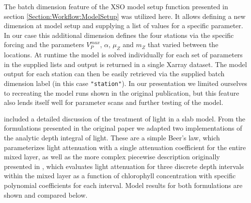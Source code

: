 \documentclass[journal abbreviation, manuscript]{copernicus}
\begin{document}
The batch dimension feature of the XSO model setup function presented in section \ref{Section:Workflow:ModelSetup} was utilized here. It allows defining a new dimension at model setup and supplying a list of values for a specific parameter. In our case this additional dimension defines the four stations via the specific forcing and the parameters $V_P^{max}$, $\alpha$, $\mu_Z$ and $m_Z$ that \citet{Anderson2015c} varied between the locations. At runtime the model is solved individually for each set of parameters in the supplied lists and output is returned in a single Xarray dataset. The model output for each station can then be easily retrieved via the supplied batch dimension label (in this case \texttt{"station"}). In our presentation we limited ourselves to recreating the model runs shown in the original publication, but this feature also lends itself well for parameter scans and further testing of the model.

\citet{Anderson2015c} included a detailed discussion of the treatment of light in a slab model. From the formulations presented in the original paper we adapted two implementations of the analytic depth integral of light. These are a simple Beer's law, which parameterizes light attenuation with a single attenuation coefficient for the entire mixed layer, as well as the more complex piecewise description originally presented in \citet{Anderson1993APhotosynthesis}, which evaluates light attenuation for three discrete depth intervals within the mixed layer as a function of chlorophyll concentration with specific polynomial coefficients for each interval. Model results for both formulations are shown and compared below.
\end{document}
